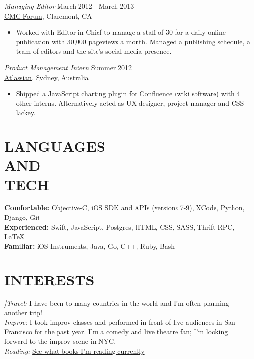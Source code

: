 \documentclass[margin, 10pt]{res} %
\begin{document}
\begin{resume}
{\sl Managing Editor} \hfill March 2012 - March 2013 \\
\href{http://cmcforum.com/}{CMC Forum}, Claremont, CA
\begin{itemize}
\item Worked with Editor in Chief to manage a staff of 30 for a daily online publication with 30,000 pageviews a month. Managed a publishing schedule, a team of editors and the site's social media presence.
\end{itemize}

{\sl Product Management Intern} \hfill Summer 2012 \\
\href{https://www.atlassian.com/}{Atlassian}, Sydney, Australia
\begin{itemize}
\item Shipped a JavaScript charting plugin for Confluence (wiki software) with 4 other interns. Alternatively acted as UX designer, project manager and CSS lackey.
\end{itemize}


\section{LANGUAGES \\ AND \\ TECH}
{\bf Comfortable:} Objective-C, iOS SDK and APIs (versions 7-9), XCode, Python, Django, Git \\
{\bf Experienced:} Swift, JavaScript, Postgres, HTML, CSS, SASS, Thrift RPC, LaTeX \\
{\bf Familiar:} iOS Instruments, Java, Go, C++, Ruby, Bash \\


\section{INTERESTS}
{\sl ]Travel:} I have been to many countries in the world and I'm often planning another trip! \\
{\sl Improv:} I took improv classes and performed in front of live audiences in San Francisco for the past year. I'm a comedy and live theatre fan; I'm looking forward to the improv scene in NYC.  \\
{\sl Reading:} \href{http://www.goodreads.com/user/show/55900995-sean-mcqueen}{See what books I'm reading currently} \\


\end{resume}
\end{document}

